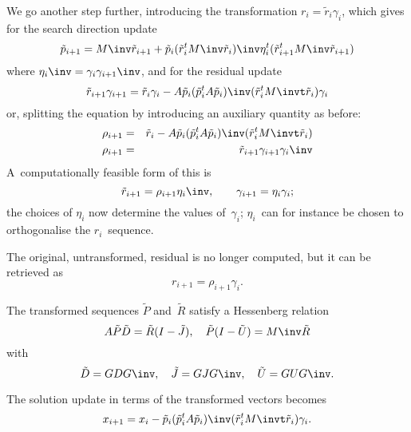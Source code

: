 \documentclass[11pt]{artikel3}
\begin{document}
\begin{Outline}
We go another step further, introducing the transformation
$r_i=\tilde r_i\gamma_i$, which gives for the search direction update
\begin{equation}
    \tilde p_{i+1}=M\inv \tilde r_{i+1}
        +\tilde p_i(\tilde r_i^tM\inv \tilde r_i)\inv\eta_i^t
                   (\tilde r_{i+1}^tM\inv \tilde r_{i+1})
    \label{eq:block-p-update}\end{equation}
where $\eta_i\inv=\gamma_i\gamma_{i+1}\inv$, and for the residual update
\[ \tilde r_{i+1}\gamma_{i+1}=\tilde r_i\gamma_i
        -A\tilde p_i(\tilde p_i^tA\tilde p_i)\inv
                (\tilde r_i^tM\invt \tilde r_i)\gamma_i\]
or, splitting the equation by introducing an auxiliary quantity as before:
\begin{eqnarray}
    \rho_{i+1}&=&\tilde r_i
        -A\tilde p_i(\tilde p_i^tA\tilde p_i)\inv
                (\tilde r_i^tM\invt \tilde r_i)
    \label{eq:block-r-update}\\
\rho_{i+1}&=&\tilde r_{i+1}\gamma_{i+1}\gamma_i\inv\nonumber
\end{eqnarray}
A~computationally feasible form of this is
\begin{equation}
 \tilde r_{i+1}=\rho_{i+1}\eta_i\inv,\qquad \gamma_{i+1}=\eta_i\gamma_i;
    \label{eq:r-ortho-from-rho}\end{equation}
the choices of $\eta_i$ now determine the values of~$\gamma_i$; $\eta_i$~can
for instance be chosen to orthogonalise the $r_i$~sequence.

The original, untransformed, residual is no longer computed, but it
can be retrieved as \[ r_{i+1} = \rho_{i+1}\gamma_i. \]

The transformed sequences $\tilde P$ and~$\tilde R$ satisfy a Hessenberg relation
\[ A\tilde P\tilde D=\tilde R(I-\tilde J),\quad
 \tilde P(I-\tilde U)=M\inv \tilde R\]
with
\[ \tilde D=GDG\inv,\quad \tilde J=GJG\inv,\quad \tilde U=GUG\inv.\]

The solution update in terms of the transformed vectors becomes
\begin{equation}
    x_{i+1}=x_i
        -\tilde p_i(\tilde p_i^tA\tilde p_i)\inv
                (\tilde r_i^tM\invt \tilde r_i)\gamma_i.
    \label{eq:block-x-update}\end{equation}


\end{Outline}
\end{document}
